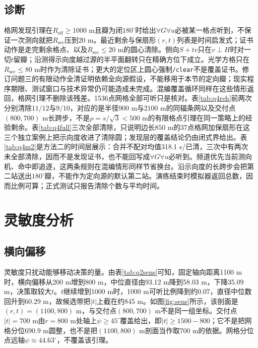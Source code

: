 \documentclass{cumcmthesis}
\begin{document}
\FloatBarrier
\subsection{诊断}

格网发现引理在$R_{\mathrm{eff}}\ge 1000$ m且瓣为闭$180^\circ$时给出$\forall G\forall u$必被某一格点听到，不保证一次测向就把$R_{\mathrm{sec}}$压到20 m。最近剩余与保扇形$(r,t)$列表是时间启发式；证书动作是走完剩余格点、以及$R_{\mathrm{sec}}\le 20$ m的圆心清除。侧向$S+tv$只在$v\perp H$时对一切$t$留瓣；沿测得示向度越过源的半平面翻转只在精确方位下成立。光学方格只在$R_{\mathrm{sec}}\le 80$ m时作为清除证书；更大的定位区上圆心强制\texttt{/clear}不是覆盖证书。修订问题三的有限动作全清证明依赖全向源假设，不能移用于本节的定向瓣；现实程序期限、测试窗口与技术异常仍可能造成未完成。混编覆盖循环同样在这些情形返回，格网引理不删除该残差。1536点网格全部可听只是核对。表\ref{tab:q4reh}前两次分别清除$11/12$与$9/10$，对应的是半径$900$ m与$2100$ m的同辐条网以及交付点$(800,700)$ m长跨步，不是$\rho=s/\sqrt{3}<500$ m的有限格点引理在同一策略上的经验剩余。表\ref{tab:q4full}三次全部清除，只说明边长$850$ m的$37$点格网加保扇形在这三个独立案例上把示向度收进了清除圆；发现层的覆盖结论仍由闭式界给出。表\ref{tab:q4m2}是方法二的时间层展示：合并不配对均值318.1 s/已清，三次中有两次未全部清除，因而不是发现证书，也不能回写成$\forall G\forall u$必听到。频道优先当前测向机、命中即追逐，这两条规则在混编情形同样节省换台。沿示向度的长跨步会把第二站送出$180^\circ$瓣，不能作为定向源的默认第二站。演练结束时模拟器返回总数，因而比例可算；正式测试只报告清除个数与平均时间。

\section{灵敏度分析}

\subsection{横向偏移}

灵敏度只扰动能够移动决策的量。由表\ref{tab:q2sens}可知，固定轴向距离1100 m时，横向偏移从200 m增到800 m，中位直径由93.12 m降到58.03 m，下降35.09 m，决策取较大$t$。$t$继续增到1000 m时，1000 m可听比例降到约0.07，直径中位数回升到60.29 m，故候选带把$|t|$上截在约845 m。如图\ref{fig:sens}所示，该剖面是$(r,t)=(1100,800)$ m，与交付点$(800,700)$ m不是同一组坐标。交付点$|t|=700$ m由$r=800$ m处轴上$\psi\ge 45^\circ$覆盖给出，即$|t|\ge 1500-800$；它不是把网格分位$690.9$ m圆整，也不是把$(1100,800)$ m剖面当作取700 m的依据。网格分位点远轴$\psi\approx 44.63^\circ$，不覆盖该引理。
\end{document}
